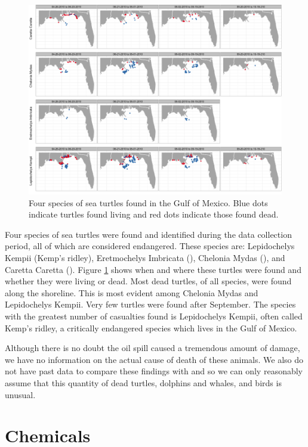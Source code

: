 \documentclass[11pt]{article}
\begin{document}
\begin{figure}[htbp] %
   \centering
   \includegraphics[width=6in]{turtles.png} 
   \caption{Four species of sea turtles found in the Gulf of Mexico.  Blue dots indicate turtles found living and red dots indicate those found dead.}
   \label{turtles}
\end{figure}

Four species of sea turtles were found and identified during the data collection period, all of which are considered endangered.  These species are: Lepidochelys Kempii (Kemp's ridley), Eretmochelys Imbricata (), Chelonia Mydas (), and Caretta Caretta (). Figure \ref{turtles} shows when and where these turtles were found and whether they were living or dead. Most dead turtles, of all species, were found along the shoreline. This is most evident among Chelonia Mydas and Lepidochelys Kempii.  Very few turtles were found after September. The species with the greatest number of casualties found is Lepidochelys Kempii, often called Kemp's ridley, a critically endangered species which lives in the Gulf of Mexico. 

Although there is no doubt the oil spill caused a tremendous amount of damage, we have no information on the actual cause of death of these animals.  We also do not have past data to compare these findings with and so we can only reasonably assume that this quantity of dead turtles, dolphins and whales, and birds is unusual.  
\section{Chemicals}
\end{document}
